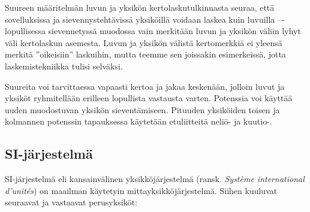 
Suureen määritelmän luvun ja yksikön kertolaskutulkinnasta seuraa, että sovelluksissa ja sievennystehtävissä yksiköillä voidaan laskea kuin luvuilla –- lopullisessa sievennetyssä muodossa vain merkitään luvun ja yksikön väliin lyhyt väli kertolaskun asemesta. Luvun ja yksikön välistä kertomerkkiä ei yleensä merkitä ''oikeisiin'' laskuihin, mutta teemme sen joissakin esimerkeissä, jotta laskemistekniikka tulisi selväksi.

Suureita voi tarvittaessa vapaasti kertoa ja jakaa keskenään, jolloin luvut ja yksiköt ryhmitellään erilleen lopullista vastausta varten. Potenssia voi käyttää uuden muodostuvan yksikön sieventämiseen. Pituuden yksiköiden toisen ja kolmannen potenssin tapauksessa käytetään etuliitteitä neliö- ja kuutio-. %

\begin{esimerkki}
\end{esimerkki}

\subsection{SI-järjestelmä}

SI-järjestelmä eli kansainvälinen yksikköjärjestelmä (ransk. \textit{Système international d'unités}) on maailman käytetyin mittayksikköjärjestelmä. Siihen kuuluvat seuraavat  ja vastaavat perusyksiköt:


